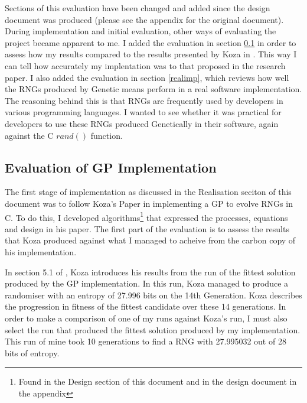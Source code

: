 \documentclass[a4paper,10.5pt]{article}
\begin{document}
Sections of this evaluation have been changed and added since the design document was produced (please see the appendix for the original document). During implementation and initial evaluation, other ways of evaluating the project became apparent to me. I added the evaluation in section \ref{evalofgp} in order to assess how my results compared to the results presented by Koza in \cite{kozarng}. This way I can tell how accurately my implentation was to that proposed in the research paper. I also added the evaluation in section \ref{realimp}, which reviews how well the RNGs produced by Genetic means perform in a real software implementation. The reasoning behind this is that RNGs are frequently used by developers in various programming languages. I wanted to see whether it was practical for developers to use these RNGs produced Genetically in their software, again against the C $rand()$ function.

\subsection{Evaluation of GP Implementation}
 \label{evalofgp}
The first stage of implementation as discussed in the Realisation seciton of this document was to follow Koza's Paper \cite{kozarng} in implementing a GP to evolve RNGs in C. To do this, I developed algorithms\footnote{Found in the Design section of this document and in the design document in the appendix} that expressed the processes, equations and design in his paper. The first part of the evaluation is to assess the results that Koza produced against what I managed to acheive from the carbon copy of his implementation.

In section 5.1 of \cite[p. 6]{kozarng}, Koza introduces his results from the run of the fittest solution produced by the GP implementation. In this run, Koza managed to produce a randomiser with an entropy of 27.996 bits on the 14th Generation. Koza describes the progression in fitness of the fittest candidate over these 14 generations. In order to make a comparison of one of my runs against Koza's run, I must also select the run that produced the fittest solution produced by my implementation. This run of mine took 10 generations to find a RNG with 27.995032 out of 28 bits of entropy.
\end{document}
